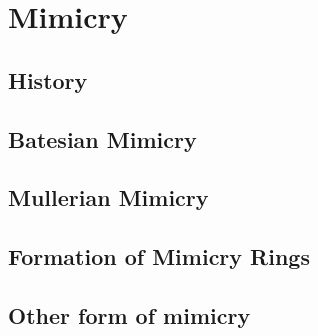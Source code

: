\chapter{Mimicry}

\section{History}

\section{Batesian Mimicry}

\section{Mullerian Mimicry}

\section{Formation of Mimicry Rings}

\section{Other form of mimicry}
